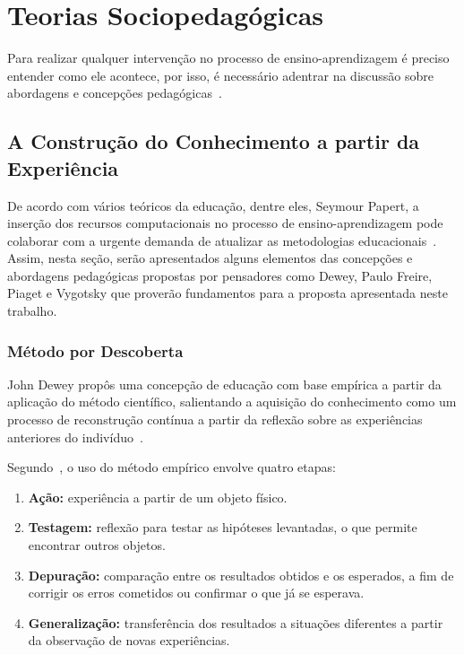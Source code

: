 \section{Teorias Sociopedagógicas}\label{section:sociopedagogicas}

Para realizar qualquer intervenção no processo de ensino-aprendizagem é preciso entender como ele acontece, por isso, é necessário adentrar na discussão sobre abordagens e concepções pedagógicas~\citep{bassedas:1996}.

\subsection{A Construção do Conhecimento a partir da Experiência}

De acordo com vários teóricos da educação, dentre eles, Seymour Papert, a inserção dos recursos computacionais no processo de ensino-aprendizagem pode colaborar com a urgente demanda de atualizar as metodologias educacionais~\citep{Almeida:2000}. Assim, nesta seção, serão apresentados alguns elementos das concepções e abordagens pedagógicas propostas por pensadores como Dewey, Paulo Freire, Piaget e Vygotsky que proverão fundamentos para a proposta apresentada neste trabalho.

\subsubsection{Método por Descoberta}

John Dewey propôs uma concepção de educação com base empírica a partir da aplicação do método científico, salientando a aquisição do conhecimento como um processo de reconstrução contínua a partir da reflexão sobre as experiências anteriores do indivíduo~\citep{Dewey:1971}.

Segundo~\cite{Almeida:2000}, o uso do método empírico envolve quatro etapas:
\begin{enumerate}
	\item \textbf{Ação:} experiência a partir de um objeto físico. 
	\item \textbf{Testagem:} reflexão para testar as hipóteses levantadas, o que permite encontrar outros objetos.
	\item \textbf{Depuração:} comparação entre os resultados obtidos e os esperados, a fim de corrigir os erros cometidos ou confirmar o que já se esperava.
	\item \textbf{Generalização:} transferência dos resultados a situações diferentes a partir da observação de novas experiências.
\end{enumerate}

